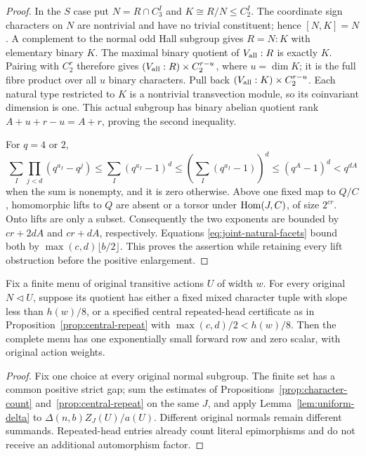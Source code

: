 \begin{proof}
In the $S$ case put $N=R\cap C_3^I$ and $K\cong R/N\leq C_2^I$.
The coordinate sign characters on $N$ are nontrivial and have no
trivial constituent; hence $[N,K]=N$. A complement to the normal odd Hall subgroup gives
$R=N:K$ with elementary binary $K$. The maximal binary quotient
of $V_{\rm all}:R$ is exactly $K$. Pairing with $C_2^r$ therefore
gives $(V_{\rm all}:R)\times C_2^{r-u}$, where $u=\dim K$;
it is the full fibre product over all $u$ binary characters.
Pull back $(V_{\rm all}:K)\times C_2^{r-u}$. Each natural type
restricted to $K$ is a nontrivial transvection module, so its
coinvariant dimension is one. This actual subgroup has binary
abelian quotient rank $A+u+r-u=A+r$, proving the second inequality.

For $q=4$ or $2$,
\[
 \sum_I\prod_{j<d}(q^{a_I}-q^j)
 \leq\sum_I(q^{a_I}-1)^d
 \leq\left(\sum_I(q^{a_I}-1)\right)^d
 \leq(q^A-1)^d<q^{dA}
\]
when the sum is nonempty, and it is zero otherwise.
Above one fixed map to $Q/C$, homomorphic lifts to $Q$ are absent
or a torsor under $\operatorname{Hom}(J,C)$, of size $2^{cr}$. Onto lifts are
only a subset. Consequently the two exponents are bounded by
$cr+2dA$ and $cr+dA$, respectively. Equations
\eqref{eq:joint-natural-facets} bound both by
$\max(c,d)\lfloor b/2\rfloor$. This proves the assertion while
retaining every lift obstruction before the positive enlargement.
\end{proof}

\begin{corollary}
\label{cor:repeated-head-forward}
Fix a finite menu of original transitive actions $U$ of width $w$.
For every original $N\lhd U$, suppose its quotient has either a
fixed mixed character tuple with slope less than $h(w)/8$, or a
specified central repeated-head certificate as in
Proposition~\ref{prop:central-repeat} with
$\max(c,d)/2<h(w)/8$. Then the complete menu has one exponentially
small forward row and zero scalar, with original action weights.
\end{corollary}
\begin{proof}
Fix one choice at every original normal subgroup. The finite set has
a common positive strict gap; sum the estimates of
Propositions~\ref{prop:character-count} and~\ref{prop:central-repeat}
on the same $J$, and apply Lemma~\ref{lem:uniform-delta} to
$\Delta(n,b)Z_J(U)/a(U)$. Different original normals remain different
summands. Repeated-head entries already count literal epimorphisms
and do not receive an additional automorphism factor.
\end{proof}

